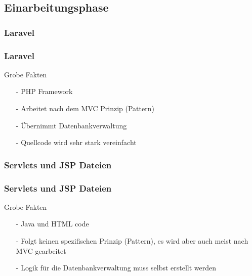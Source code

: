 \documentclass[12pt]{beamer}
\begin{document}
\subsection{Einarbeitungsphase}

\subsubsection{Laravel}

\begin{frame}
\frametitle{Laravel}

\begin{Large}
Grobe Fakten \vspace{0.2 cm}
\end{Large} 

\begin{itemize}
	\item[-] PHP Framework
	\item[-] Arbeitet nach dem MVC Prinzip (Pattern)
	\item[-] Übernimmt Datenbankverwaltung  
	\item[-] Quellcode wird sehr stark vereinfacht
\end{itemize}
	
\end{frame}


\subsubsection{Servlets und JSP Dateien}

\begin{frame}
	\frametitle{Servlets und JSP Dateien}
	
	\begin{Large}
		Grobe Fakten \vspace{0.2 cm}
	\end{Large}		
	\begin{itemize}
		\item[-] Java und HTML code
		\item[-] Folgt keinen spezifischen Prinzip (Pattern), es wird aber auch meist nach MVC gearbeitet
		\item[-] Logik für die Datenbankverwaltung muss selbst erstellt werden
		
	\end{itemize}
	
\end{frame}
\end{document}
